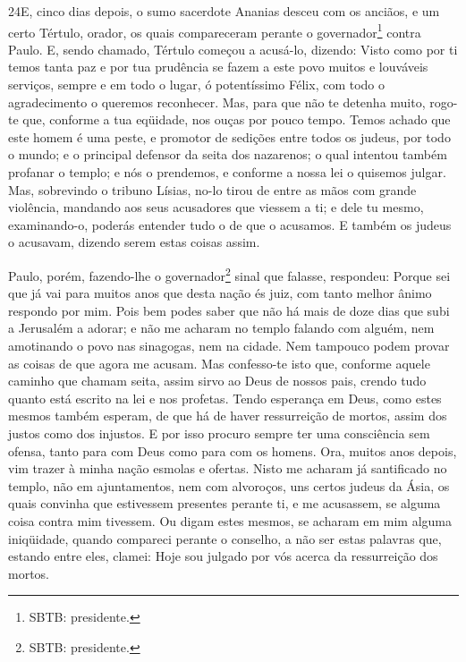 \medskip

\lettrine{24} E, cinco dias depois, o sumo sacerdote Ananias
desceu com os anciãos, e um certo Tértulo, orador, os quais
compareceram perante o governador\footnote{SBTB: presidente.} contra
Paulo. E, sendo chamado, Tértulo começou a acusá-lo, dizendo:
Visto como por ti temos tanta paz e por tua prudência se fazem a
este povo muitos e louváveis serviços, sempre e em todo o lugar,
ó potentíssimo Félix, com todo o agradecimento o queremos
reconhecer. Mas, para que não te detenha muito, rogo-te que,
conforme a tua eqüidade, nos ouças por pouco tempo. Temos achado
que este homem é uma peste, e promotor de sedições entre todos os
judeus, por todo o mundo; e o principal defensor da seita dos
nazarenos; o qual intentou também profanar o templo; e nós o
prendemos, e conforme a nossa lei o quisemos julgar. Mas,
sobrevindo o tribuno Lísias, no-lo tirou de entre as mãos com grande
violência, mandando aos seus acusadores que viessem a ti; e dele
tu mesmo, examinando-o, poderás entender tudo o de que o acusamos.
E também os judeus o acusavam, dizendo serem estas coisas assim.

Paulo, porém, fazendo-lhe o governador\footnote{SBTB:
presidente.} sinal que falasse, respondeu: Porque sei que já vai
para muitos anos que desta nação és juiz, com tanto melhor ânimo
respondo por mim. Pois bem podes saber que não há mais de
doze dias que subi a Jerusalém a adorar; e não me acharam no
templo falando com alguém, nem amotinando o povo nas sinagogas, nem
na cidade. Nem tampouco podem provar as coisas de que agora
me acusam. Mas confesso-te isto que, conforme aquele caminho
que chamam seita, assim sirvo ao Deus de nossos pais, crendo tudo
quanto está escrito na lei e nos profetas. Tendo esperança em
Deus, como estes mesmos também esperam, de que há de haver
ressurreição de mortos, assim dos justos como dos injustos. E
por isso procuro sempre ter uma consciência sem ofensa, tanto para
com Deus como para com os homens. Ora, muitos anos depois,
vim trazer à minha nação esmolas e ofertas. Nisto me acharam
já santificado no templo, não em ajuntamentos, nem com alvoroços,
uns certos judeus da Ásia, os quais convinha que estivessem
presentes perante ti, e me acusassem, se alguma coisa contra mim
tivessem. Ou digam estes mesmos, se acharam em mim alguma
iniqüidade, quando compareci perante o conselho, a não ser
estas palavras que, estando entre eles, clamei: Hoje sou julgado por
vós acerca da ressurreição dos mortos.

